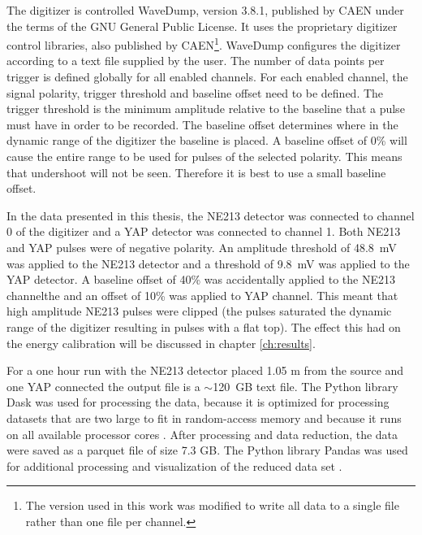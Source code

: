 \documentclass[main.tex]{subfiles}
\begin{document}

The digitizer is controlled WaveDump, version 3.8.1, published by CAEN under the terms of the GNU General Public License\cite{WaveDump}. It uses the proprietary digitizer control libraries, also published by CAEN\footnote{The version used in this work was modified to write all data to a single file rather than one file per channel.}. 
WaveDump configures the digitizer according to a text file supplied by the user. The number of data points per trigger is defined globally for all enabled channels. For each enabled channel, the signal polarity, trigger threshold and baseline offset need to be defined. The trigger threshold is the minimum amplitude relative to the baseline that a pulse must have in order to be recorded. The baseline offset determines where in the dynamic range of the digitizer the baseline is placed. A baseline offset of 0\% will cause the entire range to be used for pulses of the selected polarity. This means that undershoot will not be seen. Therefore it is best to use a small baseline offset.

In the data presented in this thesis, the NE213 detector was connected to channel 0 of the digitizer and a YAP detector was connected to channel 1. Both NE213 and YAP pulses were of negative polarity. An amplitude threshold of \SI{48.8}{mV} was applied to the NE213 detector and a threshold of \SI{9.8}{mV} was applied to the YAP detector. A baseline offset of 40\% was accidentally applied to the NE213 channelthe and an offset of 10\% was applied to  YAP channel. This meant that high amplitude NE213 pulses were clipped (the pulses saturated the dynamic range of the digitizer resulting in pulses with a flat top). The effect this had on the energy calibration will be discussed in chapter \ref{ch:results}.

For a one hour run with the NE213 detector placed 1.05 m from the source and one YAP connected the output file is a $\sim$\SI{120}{GB} text file. The Python library Dask was used for processing the data, because it is optimized for processing datasets that are two large to fit in random-access memory and because it runs on all available processor cores \cite{Dask}. After processing and data reduction, the data were saved as a parquet file of size 7.3 GB. The Python library Pandas was used for additional processing and visualization of the reduced data set \cite{Pandas}.
\end{document}
